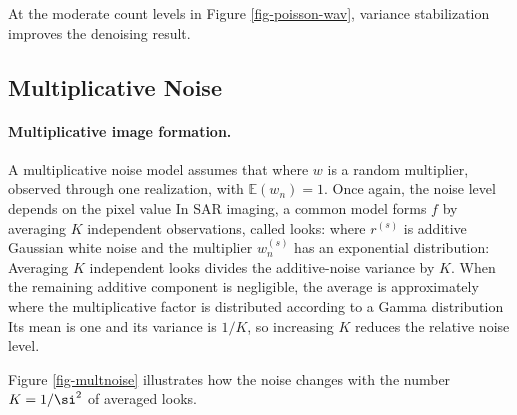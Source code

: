 At the moderate count levels in Figure \ref{fig-poisson-wav}, variance stabilization improves the denoising result.


\subsection{Multiplicative Noise}

\paragraph{Multiplicative image formation.}

A multiplicative noise model assumes that
where $w$ is a random multiplier, observed through one realization, with $\mathbb E(w_n)=1$.
Once again, the noise level depends on the pixel value
In SAR imaging, a common model forms $f$ by averaging $K$ independent observations, called looks:
where $r^{(s)}$ is additive Gaussian white noise and the multiplier $w^{(s)}_n$ has an exponential distribution:
Averaging $K$ independent looks divides the additive-noise variance by $K$. When the remaining additive component is negligible, the average is approximately
where the multiplicative factor is distributed according to a Gamma distribution
Its mean is one and its variance is $1/K$, so increasing $K$ reduces the relative noise level.


Figure \ref{fig-multnoise} illustrates how the noise changes with the number $K=1/\si^2$ of averaged looks.

